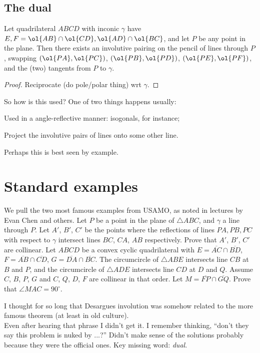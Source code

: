 \documentclass[labelsBySect]{seto}
\begin{document}
\subsection{The dual}
\begin{thm}
Let quadrilateral $ABCD$ with inconic $\gamma$ have $E,F=\ol{AB}\cap\ol{CD},\ol{AD}\cap\ol{BC}$, and let $P$ be any point in the plane. Then there exists an involutive pairing on the pencil of lines through $P$, swapping $(\ol{PA},\ol{PC})$, $(\ol{PB},\ol{PD})$, $(\ol{PE},\ol{PF})$, and the (two) tangents from $P$ to $\gamma$.
\end{thm}
\begin{proof}Reciprocate (do pole/polar thing) wrt $\gamma$.\end{proof}
So how is this used? One of two things happens usually:
\begin{alphenum}
\item Used in a angle-reflective manner: isogonals, for instance;
\item Project the involutive pairs of lines onto some other line.
\end{alphenum}
Perhaps this is best seen by example.
\section{Standard examples}
We pull the two most famous examples from USAMO, as noted in lectures by Evan Chen and others.
\exercise[AMO 2012/5]Let $P$ be a point in the plane of $\triangle ABC$, and $\gamma$ a line through $P$. Let $A'$, $B'$, $C'$ be the points where the reflections of lines $PA, PB, PC$ with respect to $\gamma$ intersect lines $BC$, $CA$, $AB$ respectively. Prove that $A'$, $B'$, $C'$ are collinear. 
\exercise[AMO 2018/5]Let $ABCD$ be a convex cyclic quadrilateral with $E = \overline{AC} \cap \overline{BD}$, $F = \overline{AB} \cap \overline{CD}$, $G = \overline{DA} \cap \overline{BC}$. The circumcircle of $\triangle ABE$ intersects line $CB$ at $B$ and $P$, and the circumcircle of $\triangle ADE$ intersects line $CD$ at $D$ and $Q$. Assume $C$, $B$, $P$, $G$ and $C$, $Q$, $D$, $F$ are collinear in that order. Let $M = \overline{FP} \cap \overline{GQ}$. Prove that $\angle MAC = 90^\circ$.

\begin{remark}
I thought for so long that Desargues involution was somehow related to the more famous theorem (at least in old culture).\\
Even after hearing that phrase I didn't get it. I remember thinking, ``don't they say this problem is nuked by ...?'' Didn't make sense of the solutions probably because they were the official ones. Key missing word: \emph{dual}.
\end{remark}
\end{document}

